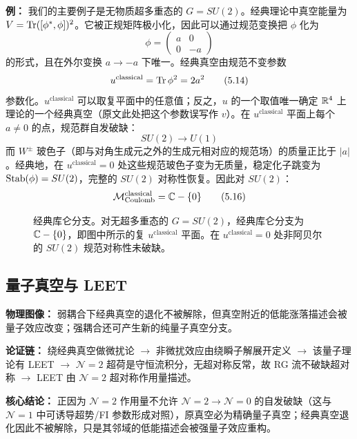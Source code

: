 \noindent\textbf{例：} 我们的主要例子是无物质超多重态的 $G=SU(2)$。经典理论中真空能量为 $V=\operatorname{Tr}([\phi^{*},\phi])^{2}$。它被正规矩阵极小化，因此可以通过规范变换把 $\phi$ 化为
\begin{equation}
\phi=
\begin{pmatrix}
a & 0\\
0 & -a
\end{pmatrix}
\tag{5.13}
\end{equation}
的形式，且在外尔变换 $a\to-a$ 下唯一。经典真空由规范不变参数
\begin{equation}
u^{\text{classical}}=\operatorname{Tr}\phi^{2}=2a^{2}
\tag{5.14}
\end{equation}
参数化。$u^{\text{classical}}$ 可以取复平面中的任意值；反之，$u$ 的一个取值唯一确定 $\mathbb{R}^{4}$ 上理论的一个经典真空（原文此处把这个参数误写作 $v$）。在 $u^{\text{classical}}$ 平面上每个 $a\neq0$ 的点，规范群自发破缺：
\begin{equation}
SU(2)\to U(1)
\tag{5.15}
\end{equation}
而 $W^{\pm}$ 玻色子（即与对角生成元之外的生成元相对应的规范场）的质量正比于 $|a|$。经典地，在 $u^{\text{classical}}=0$ 处这些规范玻色子变为无质量，稳定化子跳变为 $\operatorname{Stab}(\phi)=SU(2)$，完整的 $SU(2)$ 对称性恢复。因此对 $SU(2)$：
\begin{equation}
\mathcal{M}^{\text{classical}}_{\text{Coulomb}}=\mathbb{C}-\{0\}
\tag{5.16}
\end{equation}

\begin{figure}[H]
  \centering
  \caption{经典库仑分支。对无超多重态的 $G=SU(2)$，经典库仑分支为 $\mathbb{C}-\{0\}$，即图中所示的复 $u^{\text{classical}}$ 平面。在 $u^{\text{classical}}=0$ 处非阿贝尔的 $SU(2)$ 规范对称性未破缺。}
  \label{fig:uclassical}
\end{figure}

\subsection{量子真空与 LEET}

\begin{keytakeaways}
\item \textbf{物理图像：} 弱耦合下经典真空的退化不被解除，但真空附近的低能涨落描述会被量子效应改变；强耦合还可产生新的纯量子真空分支。
\item \textbf{论证链：} 绕经典真空做微扰论 $\to$ 非微扰效应由绕瞬子解展开定义 $\to$ 该量子理论有 LEET $\to$ $\mathcal{N}=2$ 超荷是守恒流积分，无超对称反常，故 RG 流不破缺超对称 $\to$ LEET 由 $\mathcal{N}=2$ 超对称作用量描述。
\item \textbf{核心结论：} 正因为 $\mathcal{N}=2$ 作用量不允许 $\mathcal{N}=2\to\mathcal{N}=0$ 的自发破缺（这与 $\mathcal{N}=1$ 中可诱导超势/FI 参数形成对照），原真空必为精确量子真空；经典真空退化因此不被解除，只是其邻域的低能描述会被强量子效应重构。
\end{keytakeaways}


